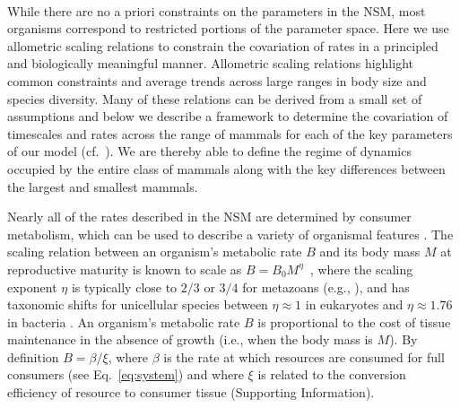 \documentclass{pnastwo}
\begin{document}
\begin{article}
 \\
While there are no a priori constraints on the parameters in the NSM, most
organisms correspond to restricted portions of the parameter space.  Here we
use allometric scaling relations to constrain the covariation of rates in a
principled and biologically meaningful manner.  Allometric scaling relations
highlight common constraints and average trends across large ranges in body
size and species diversity. Many of these relations can be derived from a
small set of assumptions and below we describe a framework to determine the
covariation of timescales and rates across the range of mammals for each of
the key parameters of our model (cf.~\cite{Yodzis:1992hg}).  We are thereby
able to define the regime of dynamics occupied by the entire class of mammals
along with the key differences between the largest and smallest mammals.


Nearly all of the rates described in the NSM are determined by consumer
metabolism, which can be used to describe a variety of organismal features
\cite{Brown:2004wq}.  The scaling relation between an organism's metabolic
rate $B$ and its body mass $M$ at reproductive maturity is known to scale as
$B = B_0 M^\eta$~\cite{West:2002it}, where the scaling exponent $\eta$ is
typically close to $2/3$ or $3/4$ for metazoans (e.g., \cite{Brown:2004wq}),
and has taxonomic shifts for unicellular species between $\eta\approx 1$ in
eukaryotes and $\eta\approx 1.76$ in bacteria
\cite{DeLong:2010dy,Kempes:2012hy}.
An organism's metabolic rate $B$ is proportional to the cost of tissue
maintenance in the absence of growth (i.e., when the body mass is $M$).  By
definition $B=\beta/\xi$, where $\beta$ is the rate at which resources are
consumed for full consumers (see Eq.~\eqref{eq:system}) and where $\xi$ is
related to the conversion efficiency of resource to consumer tissue
(Supporting Information).


\end{article}
\end{document}
